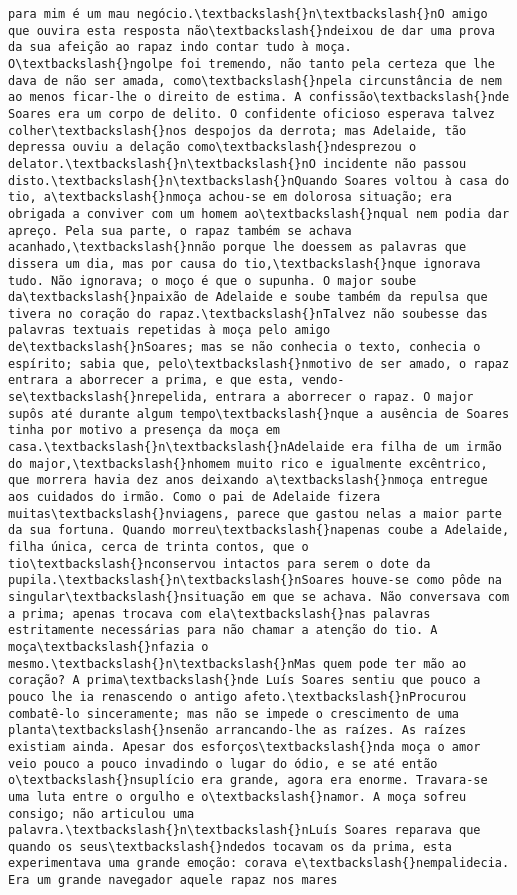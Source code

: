 \documentclass[11pt]{article}
\begin{document}
\begin{Verbatim}[commandchars=\\\{\}]
para mim é um mau negócio.\textbackslash{}n\textbackslash{}nO amigo que ouvira esta resposta não\textbackslash{}ndeixou de dar uma prova da sua afeição ao rapaz indo contar tudo à moça. O\textbackslash{}ngolpe foi tremendo, não tanto pela certeza que lhe dava de não ser amada, como\textbackslash{}npela circunstância de nem ao menos ficar-lhe o direito de estima. A confissão\textbackslash{}nde Soares era um corpo de delito. O confidente oficioso esperava talvez colher\textbackslash{}nos despojos da derrota; mas Adelaide, tão depressa ouviu a delação como\textbackslash{}ndesprezou o delator.\textbackslash{}n\textbackslash{}nO incidente não passou disto.\textbackslash{}n\textbackslash{}nQuando Soares voltou à casa do tio, a\textbackslash{}nmoça achou-se em dolorosa situação; era obrigada a conviver com um homem ao\textbackslash{}nqual nem podia dar apreço. Pela sua parte, o rapaz também se achava acanhado,\textbackslash{}nnão porque lhe doessem as palavras que dissera um dia, mas por causa do tio,\textbackslash{}nque ignorava tudo. Não ignorava; o moço é que o supunha. O major soube da\textbackslash{}npaixão de Adelaide e soube também da repulsa que tivera no coração do rapaz.\textbackslash{}nTalvez não soubesse das palavras textuais repetidas à moça pelo amigo de\textbackslash{}nSoares; mas se não conhecia o texto, conhecia o espírito; sabia que, pelo\textbackslash{}nmotivo de ser amado, o rapaz entrara a aborrecer a prima, e que esta, vendo-se\textbackslash{}nrepelida, entrara a aborrecer o rapaz. O major supôs até durante algum tempo\textbackslash{}nque a ausência de Soares tinha por motivo a presença da moça em casa.\textbackslash{}n\textbackslash{}nAdelaide era filha de um irmão do major,\textbackslash{}nhomem muito rico e igualmente excêntrico, que morrera havia dez anos deixando a\textbackslash{}nmoça entregue aos cuidados do irmão. Como o pai de Adelaide fizera muitas\textbackslash{}nviagens, parece que gastou nelas a maior parte da sua fortuna. Quando morreu\textbackslash{}napenas coube a Adelaide, filha única, cerca de trinta contos, que o tio\textbackslash{}nconservou intactos para serem o dote da pupila.\textbackslash{}n\textbackslash{}nSoares houve-se como pôde na singular\textbackslash{}nsituação em que se achava. Não conversava com a prima; apenas trocava com ela\textbackslash{}nas palavras estritamente necessárias para não chamar a atenção do tio. A moça\textbackslash{}nfazia o mesmo.\textbackslash{}n\textbackslash{}nMas quem pode ter mão ao coração? A prima\textbackslash{}nde Luís Soares sentiu que pouco a pouco lhe ia renascendo o antigo afeto.\textbackslash{}nProcurou combatê-lo sinceramente; mas não se impede o crescimento de uma planta\textbackslash{}nsenão arrancando-lhe as raízes. As raízes existiam ainda. Apesar dos esforços\textbackslash{}nda moça o amor veio pouco a pouco invadindo o lugar do ódio, e se até então o\textbackslash{}nsuplício era grande, agora era enorme. Travara-se uma luta entre o orgulho e o\textbackslash{}namor. A moça sofreu consigo; não articulou uma palavra.\textbackslash{}n\textbackslash{}nLuís Soares reparava que quando os seus\textbackslash{}ndedos tocavam os da prima, esta experimentava uma grande emoção: corava e\textbackslash{}nempalidecia. Era um grande navegador aquele rapaz nos mares 
\end{Verbatim}
\end{document}

